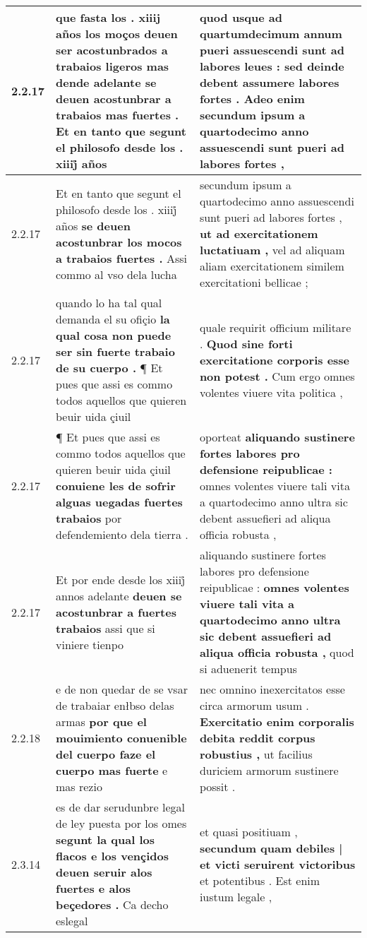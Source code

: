 \begin{tabular}{|p{1cm}|p{6.5cm}|p{6.5cm}|}
2.2.17 & que fasta los . xiiij años los moços deuen ser acostunbrados a trabaios ligeros \textbf{ mas dende adelante se deuen acostunbrar a trabaios mas fuertes . } Et en tanto que segunt el philosofo desde los . xiiij̊ años & quod usque ad quartumdecimum annum pueri assuescendi sunt ad labores leues : \textbf{ sed deinde debent assumere labores fortes . Adeo enim } secundum ipsum a quartodecimo anno assuescendi sunt pueri ad labores fortes , \\\hline
2.2.17 & Et en tanto que segunt el philosofo desde los . xiiij̊ años \textbf{ se deuen acostunbrar los mocos a trabaios fuertes . } Assi commo al vso dela lucha & secundum ipsum a quartodecimo anno assuescendi sunt pueri ad labores fortes , \textbf{ ut ad exercitationem luctatiuam , } vel ad aliquam aliam exercitationem similem exercitationi bellicae ; \\\hline
2.2.17 & quando lo ha tal qual demanda el su ofiçio \textbf{ la qual cosa non puede ser sin fuerte trabaio de su cuerpo . } ¶ Et pues que assi es commo todos aquellos que quieren beuir uida çiuil & quale requirit officium militare . \textbf{ Quod sine forti exercitatione corporis esse non potest . } Cum ergo omnes volentes viuere vita politica , \\\hline
2.2.17 & ¶ Et pues que assi es commo todos aquellos que quieren beuir uida çiuil \textbf{ conuiene les de sofrir alguas uegadas fuertes trabaios } por defendemiento dela tierra . & oporteat \textbf{ aliquando sustinere fortes labores pro defensione reipublicae : } omnes volentes viuere tali vita a quartodecimo anno ultra sic debent assuefieri ad aliqua officia robusta , \\\hline
2.2.17 & Et por ende desde los xiiij̊ annos adelante \textbf{ deuen se acostunbrar a fuertes trabaios } assi que si viniere tienpo & aliquando sustinere fortes labores pro defensione reipublicae : \textbf{ omnes volentes viuere tali vita a quartodecimo anno ultra sic debent assuefieri ad aliqua officia robusta , } quod si aduenerit tempus \\\hline
2.2.18 & e de non quedar de se vsar de trabaiar enłbso delas armas \textbf{ por que el mouimiento conuenible del cuerpo faze el cuerpo mas fuerte } e mas rezio & nec omnino inexercitatos esse circa armorum usum . \textbf{ Exercitatio enim corporalis debita reddit corpus robustius , } ut facilius duriciem armorum sustinere possit . \\\hline
2.3.14 & es de dar serudunbre legal de ley puesta por los omes \textbf{ segunt la qual los flacos e los vençidos deuen seruir alos fuertes e alos beçedores . } Ca decho eslegal & et quasi positiuam , \textbf{ secundum quam debiles | et victi seruirent victoribus } et potentibus . Est enim iustum legale , \\\hline

\end{tabular}
